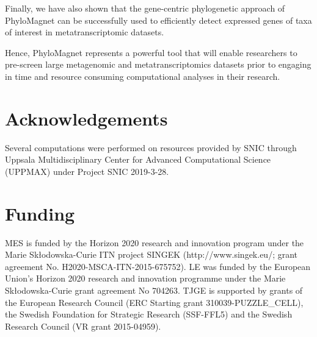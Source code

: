 \documentclass{bioinfo}
\begin{document}
Finally, we have also shown that the gene-centric phylogenetic approach of PhyloMagnet can be successfully used to efficiently detect expressed genes of taxa of interest in metatranscriptomic datasets. 

Hence, PhyloMagnet represents a powerful tool that will enable researchers to pre-screen large metagenomic and metatranscriptomics datasets prior to engaging in time and resource consuming computational analyses in their research.


\section*{Acknowledgements}
Several computations were performed on resources provided by SNIC through Uppsala Multidisciplinary Center for Advanced Computational Science (UPPMAX) under Project SNIC 2019-3-28.

\section*{Funding}
MES is funded by the Horizon 2020 research and innovation program under the Marie Sk\l{}odowska-Curie ITN project SINGEK (http://www.singek.eu/; grant agreement No. H2020-MSCA-ITN-2015-675752). LE was funded by the European Union’s Horizon 2020 research and innovation programme under the Marie Sk\l{}odowska-Curie grant agreement No 704263. TJGE is supported by grants of the European Research Council (ERC Starting grant 310039-PUZZLE\_CELL), the Swedish Foundation for Strategic Research (SSF-FFL5) and the Swedish Research Council (VR grant 2015-04959).

%



\newpage

\renewcommand\thefigure{S\arabic{figure}}
\setcounter{figure}{0}    

\begin{figure}[!t]
\caption{}\label{fig:S1}
\end{figure}

\begin{figure}[!t]
\caption{}\label{fig:S2}
\end{figure}

\renewcommand\thetable{S\arabic{table}}
\setcounter{table}{0}    

\begin{table}[!t]
\caption{}\label{tab:S1} 
\end{table}

\begin{table}[!t]
\caption{}\label{tab:S2} 
\end{table}
\end{document}
